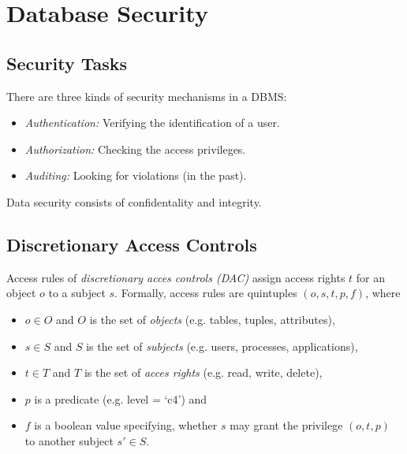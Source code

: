 

\section{Database Security}




\subsection{Security Tasks}

There are three kinds of security mechanisms in a DBMS:
\begin{itemize}
\item \emph{Authentication:} Verifying the identification of a user.
\item \emph{Authorization:} Checking the access privileges.
\item \emph{Auditing:} Looking for violations (in the past).
\end{itemize}
Data security consists of confidentality and integrity.




\subsection{Discretionary Access Controls}

Access rules of \emph{discretionary acces controls (DAC)} assign access rights $t$ for an object $o$ to a subject $s$. Formally, access rules are quintuples $(o,s,t,p,f)$, where
\begin{itemize}
\item $o \in O$ and $O$ is the set of \emph{objects} (e.g. tables, tuples, attributes),
\item $s \in S$ and $S$ is the set of \emph{subjects} (e.g. users, processes, applications),
\item $t \in T$ and $T$ is the set of \emph{acces rights} (e.g. read, write, delete),
\item $p$ is a predicate (e.g. level = `c4') and
\item $f$ is a boolean value specifying, whether $s$ may grant the privilege $(o,t,p)$ to another subject $s' \in S$.
\end{itemize}

